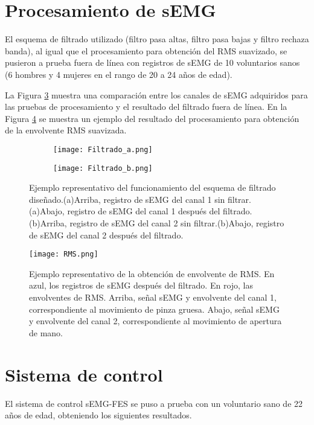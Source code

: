 \newpage
\section{Procesamiento de sEMG}
El esquema de filtrado utilizado (filtro pasa altas, filtro pasa bajas y filtro rechaza banda), al igual que el procesamiento para obtención del RMS suavizado, se pusieron a prueba fuera de línea con registros de sEMG de 10 voluntarios sanos (6 hombres y 4 mujeres en el rango de 20 a 24 años de edad).

La Figura \ref{Figura: Filtrado} muestra una comparación entre los canales de sEMG adquiridos para las pruebas de procesamiento y el resultado del filtrado fuera de línea. En la Figura \ref{Figura: RMS} se muestra un ejemplo del resultado del procesamiento para obtención de la envolvente RMS suavizada.

\begin{figure}[htbp]
	\centering
	\begin{subfigure}[htbp]{0.45\textwidth}
		\texttt{[image: Filtrado\_a.png]}
		\caption{}
		\label{Figura: Filtrado_a}
	\end{subfigure}
	\hfill
	\begin{subfigure}[htbp]{0.45\textwidth}
		\texttt{[image: Filtrado\_b.png]}
		\caption{}
		\label{Figura: Filtrado_b}
	\end{subfigure}	
	\caption[Ejemplo representativo del funcionamiento del esquema de filtrado diseñado]{Ejemplo representativo del funcionamiento del esquema de filtrado diseñado.(a)Arriba, registro de sEMG del canal 1 sin filtrar.(a)Abajo, registro de sEMG del canal 1 después del filtrado.(b)Arriba, registro de sEMG del canal 2 sin filtrar.(b)Abajo, registro de sEMG del canal 2 después del filtrado.}
	\label{Figura: Filtrado}
\end{figure}

\begin{figure}[htbp]
	\centering
	\texttt{[image: RMS.png]}
	\caption[Ejemplo representativo de la obtención de envolvente de RMS]{Ejemplo representativo de la obtención de envolvente de RMS. En azul, los registros de sEMG después del filtrado. En rojo, las envolventes de RMS. Arriba, señal sEMG y envolvente del canal 1, correspondiente al movimiento de pinza gruesa. Abajo, señal sEMG y envolvente del canal 2, correspondiente al movimiento de apertura de mano.}
	\label{Figura: RMS}
\end{figure}


\newpage
\section{Sistema de control}
El sistema de control sEMG-FES se puso a prueba con un voluntario sano de 22 años de edad, obteniendo los siguientes resultados.

